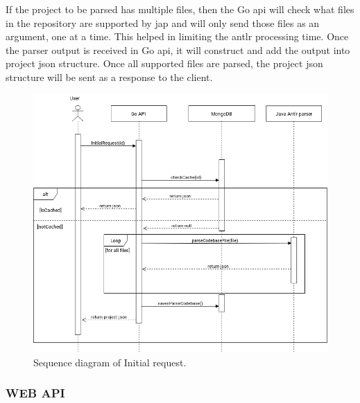 If the project to be parsed has multiple files, then the Go \gls{api} will check what files in the repository are supported by \gls{jap} and will only send those files as an argument, one at a time. This helped in limiting the \gls{antlr} processing time. Once the parser output is received in Go \gls{api}, it will construct and add the output  into project \gls{json} structure. Once all supported files are parsed, the project \gls{json} structure will be sent as a response to the \gls{client}.

\begin{figure}[H] 
    \includegraphics[width=\textwidth]{inc/images/InitialRequestSequenceDiagram.png}
    \caption{Sequence diagram of Initial request.}
    \label{fig:sequenceInitial}
\end{figure}

\subsubsection{WEB API}

